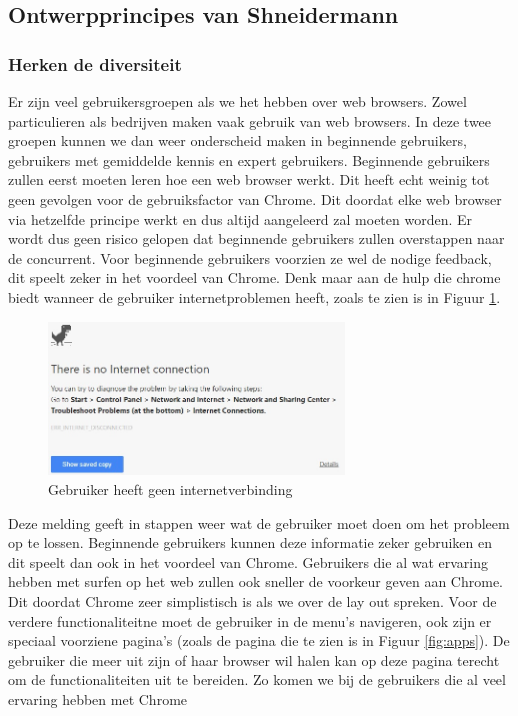 \documentclass[12pt]{article}
\begin{document}
\subsection{Ontwerpprincipes van Shneidermann}
\subsubsection{Herken de diversiteit}
Er zijn veel gebruikersgroepen als we het hebben over web browsers. Zowel particulieren als bedrijven maken vaak gebruik van web browsers. In deze twee groepen kunnen we dan weer onderscheid maken in beginnende gebruikers, gebruikers met gemiddelde kennis en expert gebruikers. 
\linebreak
Beginnende gebruikers zullen eerst moeten leren hoe een web browser werkt. Dit heeft echt weinig tot geen gevolgen voor de gebruiksfactor van Chrome. Dit doordat elke web browser via hetzelfde principe werkt en dus altijd aangeleerd zal moeten worden. Er wordt dus geen risico gelopen dat beginnende gebruikers zullen overstappen naar de concurrent. Voor beginnende gebruikers voorzien ze wel de nodige feedback, dit speelt zeker in het voordeel van Chrome. Denk maar aan de hulp die chrome biedt wanneer de gebruiker internetproblemen heeft, zoals te zien is in Figuur \ref{fig:nocon}.
\begin{figure}
  \centering
    \includegraphics[width=0.7\textwidth]{NoConnection.jpg}
  \caption{Gebruiker heeft geen internetverbinding}
  \label{fig:nocon}
\end{figure}
Deze melding geeft in stappen weer wat de gebruiker moet doen om het probleem op te lossen. Beginnende gebruikers kunnen deze informatie zeker gebruiken en dit speelt dan ook in het voordeel van Chrome.
\newpage
Gebruikers die al wat ervaring hebben met surfen op het web zullen ook sneller de voorkeur geven aan Chrome. Dit doordat Chrome zeer simplistisch is als we over de lay out spreken. Voor de verdere functionaliteitne moet de gebruiker in de menu's navigeren, ook zijn er speciaal voorziene pagina's (zoals de pagina die te zien is in Figuur \ref{fig:apps}). De gebruiker die meer uit zijn of haar browser wil halen kan op deze pagina terecht om de functionaliteiten uit te bereiden. Zo komen we bij de gebruikers die al veel ervaring hebben met Chrome
\end{document}
